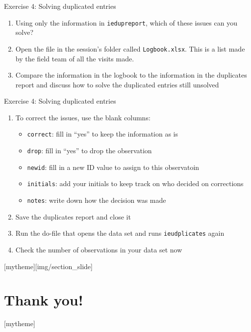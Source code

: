 \documentclass[aspectratio=169]{beamer}
\newcommand{\sectionpic}[2]{
	\setbeamertemplate{section page}[mytheme][#2]
	\section{#1}
	\setbeamertemplate{section page}[mytheme]
}
\begin{document}
\begin{frame}{Exercise 4: Solving duplicated entries}
    \begin{enumerate}
        \item Using only the information in \texttt{iedupreport}, which of these issues can you solve?
        \item Open the file in the session's folder called \texttt{Logbook.xlsx}. This is a list made by the field team of all the visits made.
        \item Compare the information in the logbook to the information in the duplicates report and discuss how to solve the duplicated entries still unsolved
    \end{enumerate}
\end{frame}

\begin{frame}{Exercise 4: Solving duplicated entries}
    \begin{enumerate}
        \item To correct the issues, use the blank columns:
        \begin{itemize}
            \item \texttt{correct}: fill in ``yes'' to keep the information as is
            \item \texttt{drop}: fill in ``yes'' to drop the observation
            \item \texttt{newid}: fill in a new ID value to assign to this observatoin
            \item \texttt{initials}: add your initials to keep track on who decided on corrections
            \item \texttt{notes}: write down how the decision was made
        \end{itemize}
        \item Save the duplicates report and close it
        \item Run the do-file that opens the data set and runs \texttt{ieudplicates} again
        \item Check the number of observations in your data set now
    \end{enumerate}
\end{frame}


\sectionpic{Thank you!}{img/section_slide}
\end{document}
